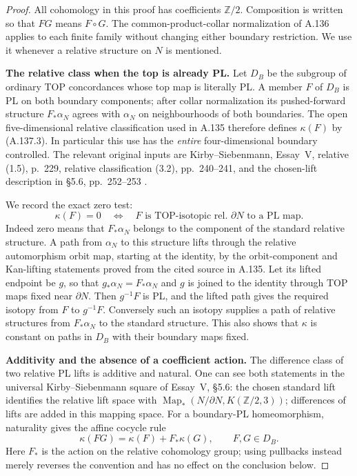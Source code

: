 \begin{proof}
All cohomology in this proof has coefficients $\mathbb Z/2$.
Composition is written so that $FG$ means $F\circ G$.
The common-product-collar normalization of A.136 applies to each
finite family without changing either boundary restriction. We use
it whenever a relative structure on $N$ is mentioned.

\textbf{The relative class when the top is already PL.}
Let $D_B$ be the subgroup of ordinary TOP concordances whose top map
is literally PL. A member $F$ of $D_B$ is PL on both boundary
components; after collar normalization its pushed-forward structure
$F_*\alpha_N$ agrees with $\alpha_N$ on neighbourhoods of both
boundaries. The open five-dimensional relative classification used
in A.135 therefore defines $\kappa(F)$ by (A.137.3). In particular
this use has the \emph{entire} four-dimensional boundary controlled.
The relevant original inputs are Kirby--Siebenmann, Essay~V,
relative (1.5), p.~229, relative classification (3.2), pp.~240--241,
and the chosen-lift description in \S5.6, pp.~252--253
\cite{KirbySiebenmann1977}.

We record the exact zero test:
\[
 \kappa(F)=0
 \quad\Longleftrightarrow\quad
 F\text{ is TOP-isotopic rel. }\partial N
      \text{ to a PL map}.                             \tag{A.137.4}
\]
Indeed zero means that $F_*\alpha_N$ belongs to the component of the
standard relative structure. A path from $\alpha_N$ to this
structure lifts through the relative automorphism orbit map, starting
at the identity, by the orbit-component and Kan-lifting statements
proved from the cited source in A.135. Let its lifted endpoint be
$g$, so that $g_*\alpha_N=F_*\alpha_N$ and $g$ is joined to the
identity through TOP maps fixed near $\partial N$. Then $g^{-1}F$
is PL, and the lifted path gives the required isotopy from $F$ to
$g^{-1}F$. Conversely such an isotopy supplies a path of relative
structures from $F_*\alpha_N$ to the standard structure. This also
shows that $\kappa$ is constant on paths in $D_B$ with their boundary
maps fixed.

\textbf{Additivity and the absence of a coefficient action.}
The difference class of two relative PL lifts is additive and
natural. One can see both statements in the universal
Kirby--Siebenmann square of Essay~V, \S5.6: the chosen standard lift
identifies the relative lift space with
$\operatorname{Map}_*(N/\partial N,K(\mathbb Z/2,3))$;
differences of lifts are added in this mapping space. For a
boundary-PL homeomorphism, naturality gives the affine cocycle rule
\[
 \kappa(FG)=\kappa(F)+F_*\kappa(G),\qquad F,G\in D_B.   \tag{A.137.5}
\]
Here $F_*$ is the action on the relative cohomology group; using
pullbacks instead merely reverses the convention and has no effect
on the conclusion below.


\end{proof}

